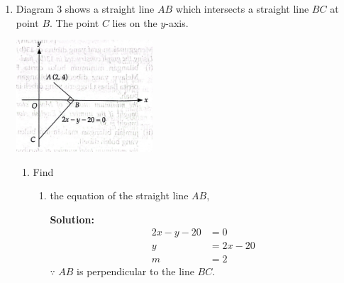 \documentclass{report}
\newcommand{\sol}{\textbf{Solution:}}
\begin{document}
\begin{enumerate}[leftmargin=*]
          \begin{enumerate}
              \item Plot $\dfrac{y}{x}$ against $x$ by using a scale of $2 \mathrm{~cm}$ to 1 unit
                    on the $x$-axis and $2 \mathrm{~cm}$ to 0.5 unit on the $\dfrac{y}{x}$-axis.
                    Hence, draw the line of best fit.
              \item Using the graph in $9(a)$, find the value of
                    \begin{enumerate}
                        \item $p$,
                        \item $q$.
                    \end{enumerate}
          \end{enumerate}
          \sol{}

          Lazy to do this. =)

    \item Diagram 3 shows a straight line $A B$ which intersects a straight line $B C$ at
          point $B$. The point $C$ lies on the $y$-axis.
          \begin{center}
              \includegraphics[width=0.4\textwidth]{./assets/10.png}
          \end{center}

          \newpage
          \begin{enumerate}
              \item Find
                    \begin{enumerate}
                        \item the equation of the straight line $A B$,

                              \sol{}
                              \begin{align*}
                                  2x - y -20 & = 0       \\
                                  y          & = 2x - 20 \\
                                  m          & = 2
                              \end{align*}
                              $\because$ $AB$ is perpendicular to the line $BC$.


\end{enumerate}
\end{enumerate}
\end{enumerate}
\end{document}
